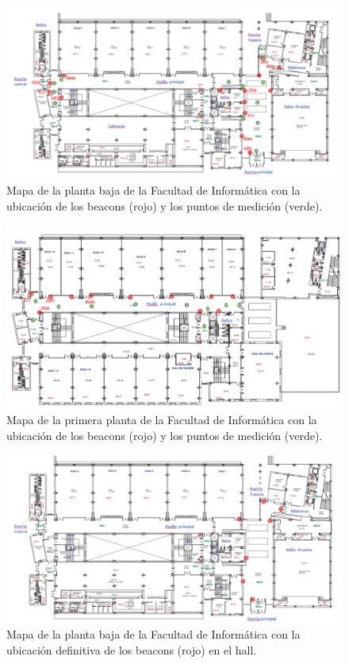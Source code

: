 \begin{figure}[t]
	\centering
	\includegraphics[width=1\textwidth]{Imagenes/Descripciondeltrabajo/mapa_mediciones_plantabaja}
	\caption{Mapa de la planta baja de la Facultad de Informática con la ubicación de los beacons (rojo) y los puntos de medición (verde). }
	\label{fig:medidasPBaja}
\end{figure}

\begin{figure}[t]
	\centering
	\includegraphics[width=1\textwidth]{Imagenes/Descripciondeltrabajo/mapa_mediciones_planta1}
	\caption{Mapa de la primera planta de la Facultad de Informática con la ubicación de los beacons (rojo) y los puntos de medición (verde). }
	\label{fig:medidasPPrimera}
\end{figure}

\begin{figure}[t]
	\centering
	\includegraphics[width=1\textwidth]{Imagenes/Descripciondeltrabajo/beacons_plantabaja_final}
	\caption{Mapa de la planta baja de la Facultad de Informática con la ubicación definitiva de los beacons (rojo) en el hall. }
	\label{fig:beaconsPBaja}
\end{figure}

